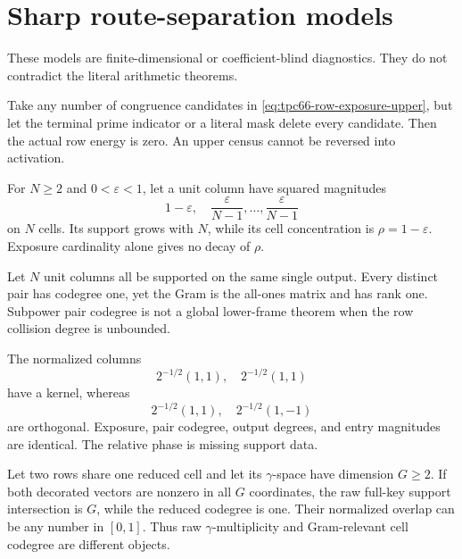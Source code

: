 \section{Sharp route-separation models}

These models are finite-dimensional or coefficient-blind diagnostics. They do
not contradict the literal arithmetic theorems.

\begin{example}
Take any number of congruence candidates in
\eqref{eq:tpc66-row-exposure-upper}, but let the terminal prime indicator or a
literal mask delete every candidate. Then the actual row energy is zero. An
upper census cannot be reversed into activation.
\end{example}

\begin{example}
For \(N\ge2\) and \(0<\varepsilon<1\), let a unit column have squared magnitudes
\[
 1-\varepsilon,\quad
 \frac{\varepsilon}{N-1},\ldots,\frac{\varepsilon}{N-1}
\]
on \(N\) cells. Its support grows with \(N\), while its cell concentration is
\(\rho=1-\varepsilon\). Exposure cardinality alone gives no decay of \(\rho\).
\end{example}

\begin{example}
Let \(N\) unit columns all be supported on the same single output. Every
distinct pair has codegree one, yet the Gram is the all-ones matrix and has
rank one. Subpower pair codegree is not a global lower-frame theorem when the
row collision degree is unbounded.
\end{example}

\begin{example}
The normalized columns
\[
 2^{-1/2}(1,1),\quad2^{-1/2}(1,1)
\]
have a kernel, whereas
\[
 2^{-1/2}(1,1),\quad2^{-1/2}(1,-1)
\]
are orthogonal. Exposure, pair codegree, output degrees, and entry magnitudes
are identical. The relative phase is missing support data.
\end{example}

\begin{example}
Let two rows share one reduced cell and let its \(\gamma\)-space have dimension
\(G\ge2\). If both decorated vectors are nonzero in all \(G\) coordinates, the raw
full-key support intersection is \(G\), while the reduced codegree is one.
Their normalized overlap can be any number in \([0,1]\). Thus raw
\(\gamma\)-multiplicity and Gram-relevant cell codegree are different objects.
\end{example}

